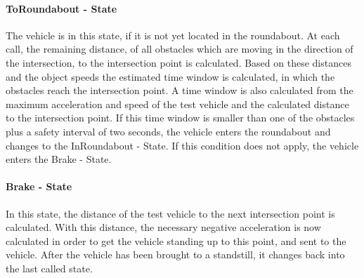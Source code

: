 \documentclass[11pt,oneside,openright]{mpreport}
\begin{document}
\paragraph{ToRoundabout - State}
The vehicle is in this state, if it is not yet located in the roundabout. At each call, the remaining distance,
of all obstacles which are moving in the direction of the intersection, to the intersection point is calculated.
Based on these distances and the object speeds the estimated time window is calculated, in which the obstacles reach the intersection point.
A time window is also calculated from the maximum acceleration and speed of the test vehicle and the calculated distance to the intersection point.
If this time window is smaller than one of the obstacles plus a safety interval of two seconds, the vehicle enters the roundabout and changes to the InRoundabout - State.
If this condition does not apply, the vehicle enters the Brake - State.

\paragraph{Brake - State}
In this state, the distance of the test vehicle to the next intersection point is calculated.
With this distance, the necessary negative acceleration is now calculated in order to get the vehicle standing up to this point,
and sent to the vehicle. After the vehicle has been brought to a standstill, it changes back into the last called state.
\end{document}
